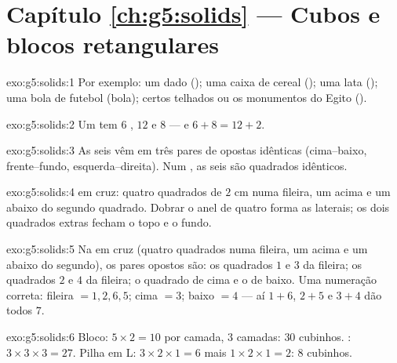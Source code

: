 \section*{Capítulo \ref{ch:g5:solids} --- Cubos e blocos retangulares}

\begin{solution}{exo:g5:solids:1}
Por exemplo: um dado (); uma caixa de cereal ();
uma lata (); uma bola de futebol (bola); certos telhados ou
os monumentos do Egito ().
\end{solution}

\begin{solution}{exo:g5:solids:2}
Um  tem $6$ , $12$  e $8$  --- e
$6 + 8 = 12 + 2$. \checkmark
\end{solution}

\begin{solution}{exo:g5:solids:3}
As seis  vêm em três pares de  opostas idênticas
(cima--baixo, frente--fundo, esquerda--direita). Num , as seis
 são quadrados idênticos.
\end{solution}

\begin{solution}{exo:g5:solids:4}
 em cruz: quatro quadrados de $2$ cm numa fileira, um
acima e um abaixo do segundo quadrado. Dobrar o anel de quatro forma
as laterais; os dois quadrados extras fecham o topo e o fundo.
\end{solution}

\begin{solution}{exo:g5:solids:5}
Na  em cruz (quatro quadrados numa fileira, um acima e um
abaixo do segundo), os pares opostos são: os quadrados $1$ e $3$ da
fileira; os quadrados $2$ e $4$ da fileira; o quadrado de cima e o de
baixo. Uma numeração correta: fileira $= 1, 2, 6, 5$; cima $= 3$;
baixo $= 4$ --- aí $1{+}6$, $2{+}5$ e $3{+}4$ dão todos $7$.
\end{solution}

\begin{solution}{exo:g5:solids:6}
Bloco: $5 \times 2 = 10$ por camada, $3$ camadas: $30$ cubinhos.
: $3 \times 3 \times 3 = 27$. Pilha em L:
$3 \times 2 \times 1 = 6$ mais $1 \times 2 \times 1 = 2$: $8$
cubinhos.
\end{solution}

